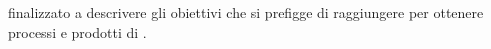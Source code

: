  finalizzato a descrivere gli obiettivi che \gruppo si prefigge di raggiungere per ottenere processi e prodotti di .